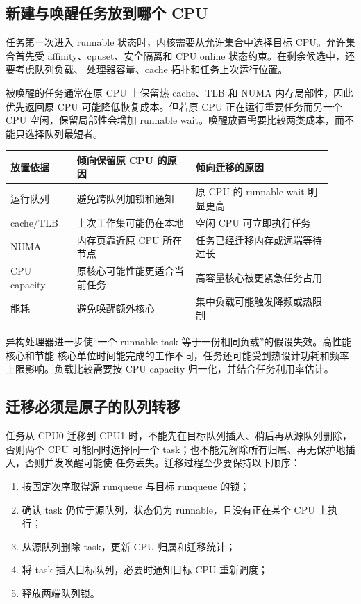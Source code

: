 \subsection{新建与唤醒任务放到哪个 CPU}

任务第一次进入 runnable 状态时，内核需要从允许集合中选择目标 CPU。允许集合首先受
affinity、cpuset、安全隔离和 CPU online 状态约束。在剩余候选中，还要考虑队列负载、
处理器容量、cache 拓扑和任务上次运行位置。

被唤醒的任务通常在原 CPU 上保留热 cache、TLB 和 NUMA 内存局部性，因此优先返回原 CPU
可能降低恢复成本。但若原 CPU 正在运行重要任务而另一个 CPU 空闲，保留局部性会增加
runnable wait。唤醒放置需要比较两类成本，而不能只选择队列最短者。

\begin{longtable}{|L{0.19\linewidth}|L{0.34\linewidth}|L{0.39\linewidth}|}
\toprule
放置依据 & 倾向保留原 CPU 的原因 & 倾向迁移的原因 \\
\midrule
运行队列 & 避免跨队列加锁和通知 & 原 CPU 的 runnable wait 明显更高 \\\tablerowrule
cache/TLB & 上次工作集可能仍在本地 & 空闲 CPU 可立即执行任务 \\\tablerowrule
NUMA & 内存页靠近原 CPU 所在节点 & 任务已经迁移内存或远端等待过长 \\\tablerowrule
CPU capacity & 原核心可能性能更适合当前任务 & 高容量核心被更紧急任务占用 \\\tablerowrule
能耗 & 避免唤醒额外核心 & 集中负载可能触发降频或热限制 \\
\bottomrule
\end{longtable}

异构处理器进一步使“一个 runnable task 等于一份相同负载”的假设失效。高性能核心和节能
核心单位时间能完成的工作不同，任务还可能受到热设计功耗和频率上限影响。负载比较需要按
CPU capacity 归一化，并结合任务利用率估计。

\subsection{迁移必须是原子的队列转移}

任务从 CPU0 迁移到 CPU1 时，不能先在目标队列插入、稍后再从源队列删除，否则两个 CPU
可能同时选择同一个 task；也不能先解除所有归属、再无保护地插入，否则并发唤醒可能使
任务丢失。迁移过程至少要保持以下顺序：

\begin{enumerate}
\tightlist
\item 按固定次序取得源 runqueue 与目标 runqueue 的锁；
\item 确认 task 仍位于源队列，状态仍为 runnable，且没有正在某个 CPU 上执行；
\item 从源队列删除 task，更新 CPU 归属和迁移统计；
\item 将 task 插入目标队列，必要时通知目标 CPU 重新调度；
\item 释放两端队列锁。
\end{enumerate}

